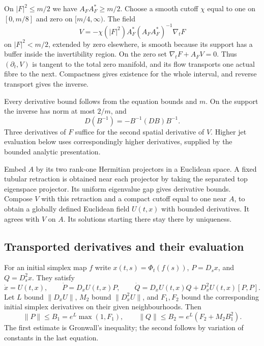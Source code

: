 On $|F|^2\le m/2$ we have $A_FA_F^*\ge m/2$. Choose a smooth
cutoff $\chi$ equal to one on $[0,m/8]$ and zero on $[m/4,\infty)$.
The field
\begin{equation}\label{eq:equation-horizontal-field}
 V=-\chi(|F|^2)A_F^*(A_FA_F^*)^{-1}\nabla_tF
\end{equation}
on $|F|^2<m/2$, extended by zero elsewhere, is smooth because
its support has a buffer inside the invertibility region. On the
zero set $\nabla_tF+A_FV=0$. Thus $(\partial_t,V)$ is tangent
to the total zero manifold, and its flow transports one actual
fibre to the next. Compactness gives existence for the whole
interval, and reverse transport gives the inverse.

Every derivative bound follows from the equation bounds and $m$.
On the support the inverse has norm at most $2/m$, and
\[
                         D(B^{-1})=-B^{-1}(DB)B^{-1}.
\]
Three derivatives of $F$
suffice for the second spatial derivative of $V$. Higher jet
evaluation below uses correspondingly higher derivatives, supplied
by the bounded analytic presentation.

Embed $A$ by its two rank-one Hermitian projectors in a Euclidean
space. A fixed tubular retraction is obtained near each projector
by taking the separated top eigenspace projector. Its uniform
eigenvalue gap gives derivative bounds. Compose $V$ with this
retraction and a compact cutoff equal to one near $A$, to obtain
a globally defined Euclidean field $U(t,x)$ with bounded derivatives.
It agrees with $V$ on $A$. Its solutions starting there stay there
by uniqueness.

\subsection{Transported derivatives and their evaluation}

For an initial simplex map $f$ write
$x(t,s)=\Phi_t(f(s))$, $P=D_sx$, and $Q=D_s^2x$.
They satisfy
\begin{equation}\label{eq:transport-jets}
 \dot x=U(t,x),\qquad
 \dot P=D_xU(t,x)P,\qquad
 \dot Q=D_xU(t,x)Q+D_x^2U(t,x)[P,P].
\end{equation}
Let $L$ bound $\|D_xU\|$, $M_2$ bound $\|D_x^2U\|$, and
$F_1,F_2$ bound the corresponding initial simplex derivatives on
their given neighbourhoods. Then
\begin{equation}\label{eq:jet-size-bounds}
 \|P\|\le B_1=e^L\max(1,F_1),\qquad
 \|Q\|\le B_2=e^L(F_2+M_2B_1^2).
\end{equation}
The first estimate is Gronwall's inequality; the second follows
by variation of constants in the last equation.

